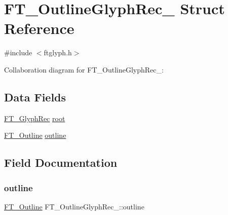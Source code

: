 \hypertarget{struct_f_t___outline_glyph_rec__}{}\section{F\+T\+\_\+\+Outline\+Glyph\+Rec\+\_\+ Struct Reference}
\label{struct_f_t___outline_glyph_rec__}


{\ttfamily \#include $<$ftglyph.\+h$>$}



Collaboration diagram for F\+T\+\_\+\+Outline\+Glyph\+Rec\+\_\+\+:
\subsection*{Data Fields}
\begin{DoxyCompactItemize}
\item 
\hyperlink{ftglyph_8h_a095b515f46c978b33ffc9c20aad081a4}{F\+T\+\_\+\+Glyph\+Rec} \hyperlink{struct_f_t___outline_glyph_rec___a71e5a8d5fe69e0cea68c96486dd6713f}{root}
\item 
\hyperlink{ftimage_8h_a79cb182373b5aa3041955b19ce32afca}{F\+T\+\_\+\+Outline} \hyperlink{struct_f_t___outline_glyph_rec___af1bd473a32fcbc500edcfcf89e3ac8ac}{outline}
\end{DoxyCompactItemize}


\subsection{Field Documentation}
\mbox{\label{struct_f_t___outline_glyph_rec___af1bd473a32fcbc500edcfcf89e3ac8ac}} 
\subsubsection{\texorpdfstring{outline}{outline}}
{\footnotesize\ttfamily \hyperlink{ftimage_8h_a79cb182373b5aa3041955b19ce32afca}{F\+T\+\_\+\+Outline} F\+T\+\_\+\+Outline\+Glyph\+Rec\+\_\+\+::outline}

\mbox{\label{struct_f_t___outline_glyph_rec___a71e5a8d5fe69e0cea68c96486dd6713f}} 
